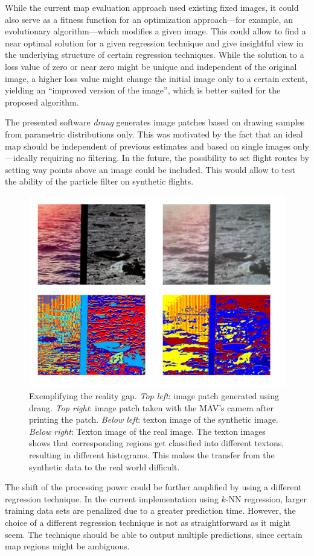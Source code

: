 \documentclass{report}
\begin{document}
While the current map evaluation approach used existing fixed images,
it could also serve as a fitness function for an optimization
approach---for example, an evolutionary algorithm---which modifies a
given image. This could allow to find a near optimal solution for a
given regression technique and give insightful view in the underlying
structure of certain regression techniques. While the solution to a
loss value of zero or near zero might be unique and independent of the
original image, a higher loss value might change the initial image
only to a certain extent, yielding an ``improved version of the
image'', which is better suited for the proposed algorithm.

The presented software \emph{draug} generates image patches based on
drawing samples from parametric distributions only. This was motivated
by the fact that an ideal map should be independent of previous
estimates and based on single images only---ideally requiring no
filtering. In the future, the possibility to set flight routes by
setting way points above an image could be included. This would allow
to test the ability of the particle filter on synthetic flights.

\begin{figure}[h!]
\begin{center}
\includegraphics[width=0.448\columnwidth]{realitygap}
\caption{{\label{fig:realitygap}
Exemplifying the reality gap. \emph{Top left}: image patch generated using draug. \emph{Top
      right}: image patch taken with the MAV's camera after printing
    the patch. \emph{Below left}: texton image of the synthetic
    image. \emph{Below right}: Texton image of the real image. The
    texton images shows that corresponding regions get classified into
    different textons, resulting in different histograms. This makes
    the transfer from the synthetic data to the real world difficult.%
}}
\end{center}
\end{figure}

The shift of the processing power could be further amplified by using
a different regression technique. In the current implementation using
$k$-NN regression, larger training data sets are penalized due to a
greater prediction time. However, the choice of a different regression
technique is not as straightforward as it might seem. The technique
should be able to output multiple predictions, since certain map
regions might be ambiguous.
\end{document}
